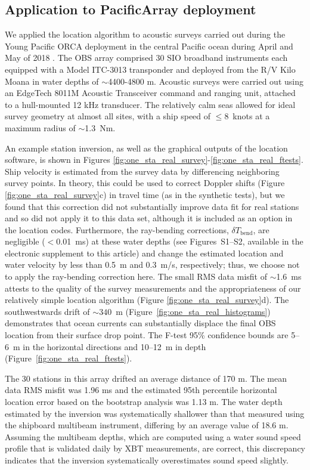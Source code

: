\subsection{Application to PacificArray deployment} \label{sec:PacificArray_deployment}
We applied the location algorithm to acoustic surveys carried out during the Young Pacific ORCA deployment in the central Pacific ocean during April and May of 2018 \citep{Gaherty2018}. The OBS array comprised 30 SIO broadband instruments each equipped with a Model ITC-3013 transponder and deployed from the R/V Kilo Moana in water depths of $\sim$4400-4800 m. Acoustic  surveys were carried out using an EdgeTech 8011M Acoustic Transceiver command and ranging unit, attached to a hull-mounted 12 kHz transducer. The relatively calm seas allowed for ideal survey geometry at almost all sites, with a ship speed of \mbox{$\le$8~knots} at a maximum radius of \mbox{$\sim$1.3~Nm}. 

An example station inversion, as well as the graphical outputs of the location software, is shown in Figures \ref{fig:one_sta_real_survey}-\ref{fig:one_sta_real_ftests}. Ship velocity is estimated from the survey data by differencing neighboring survey points. In theory, this could be used to correct Doppler shifts (Figure \ref{fig:one_sta_real_survey}c) in travel time (as in the synthetic tests), but we found that this correction did not substantially improve data fit for real stations and so did not apply it to this data set, although it is included as an option in the location codes. Furthermore, the ray-bending corrections, $\delta T_{\text{bend}}$, are negligible ($<$0.01~ms) at these water depths (see Figures~S1--S2, available in the electronic supplement to this article) and change the estimated location and water velocity by less than 0.5~m and 0.3~m/s, respectively; thus, we choose not to apply the ray-bending correction here. The small RMS data misfit of $\sim$1.6~ms attests to the quality of the survey measurements and the appropriateness of our relatively simple location algorithm (Figure \ref{fig:one_sta_real_survey}d). The southwestwards drift of \mbox{$\sim340$~m} (Figure~\ref{fig:one_sta_real_histograms}) demonstrates that ocean currents can substantially displace the final OBS location from their surface drop point. The F-test 95\% confidence bounds are 5--6~m in the horizontal directions and 10--12~m in depth (Figure~\ref{fig:one_sta_real_ftests}).

The 30 stations in this array drifted an average distance of 170 m. The mean data RMS misfit was 1.96 ms and the estimated 95th percentile horizontal location error based on the bootstrap analysis was 1.13 m. The water depth estimated by the inversion was systematically shallower than that measured using the shipboard multibeam instrument, differing by an average value of 18.6 m. Assuming the multibeam depths, which are computed using a water sound speed profile that is validated daily by XBT measurements, are correct, this discrepancy indicates that the inversion systematically overestimates sound speed slightly. 

